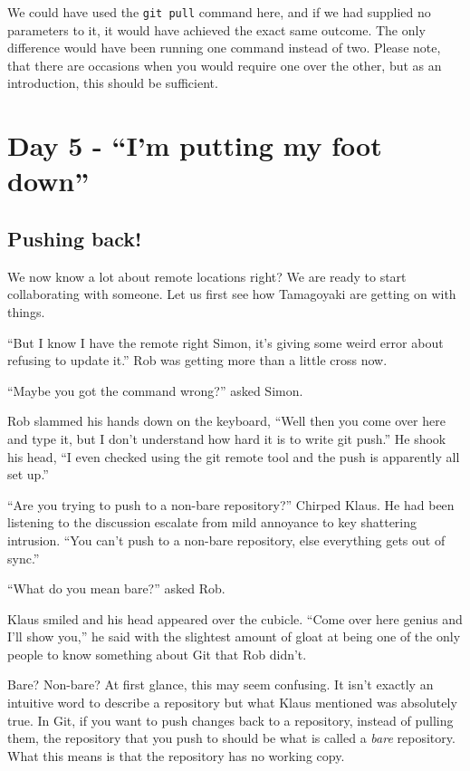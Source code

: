We could have used the \texttt{git pull} command here, and if we had supplied no parameters to it, it would have achieved the exact same outcome.
The only difference would have been running one command instead of two.
Please note, that there are occasions when you would require one over the other, but as an introduction, this should be sufficient.

\section{Day 5 - ``I'm putting my foot down''}
\subsection{Pushing back!}

We now know a lot about remote locations right? We are ready to start collaborating with someone.
Let us first see how Tamagoyaki are getting on with things.

\begin{trenches}
``But I know I have the remote right Simon, it's giving some weird error about refusing to update it.''
Rob was getting more than a little cross now.

``Maybe you got the command wrong?'' asked Simon.

Rob slammed his hands down on the keyboard,
``Well then you come over here and type it, but I don't understand how hard it is to write git push.''
He shook his head, ``I even checked using the git remote tool and the push is apparently all set up.''

``Are you trying to push to a non-bare repository?'' Chirped Klaus.
He had been listening to the discussion escalate from mild annoyance to key shattering intrusion.
``You can't push to a non-bare repository, else everything gets out of sync.''

``What do you mean bare?'' asked Rob.

Klaus smiled and his head appeared over the cubicle.
``Come over here genius and I'll show you,'' he said with the slightest amount of gloat at being one of the only people to know something about Git that Rob didn't.
\end{trenches}

Bare? Non-bare? At first glance, this may seem confusing.
It isn't exactly an intuitive word to describe a repository but what Klaus mentioned was absolutely true.
In Git, if you want to push changes back to a repository, instead of pulling them, the repository that you push to should be what is called a \emph{bare} repository.
What this means is that the repository has no working copy.


